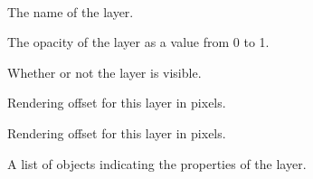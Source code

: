 \documentclass[letterpaper,10pt,english]{sphinxmanual}
\begin{document}
\begin{fulllineitems}
\label{index:tmx.Layer}~

\begin{fulllineitems}
\label{index:tmx.Layer.name}
The name of the layer.

\end{fulllineitems}


\begin{fulllineitems}
\label{index:tmx.Layer.opacity}
The opacity of the layer as a value from 0 to 1.

\end{fulllineitems}


\begin{fulllineitems}
\label{index:tmx.Layer.visible}
Whether or not the layer is visible.

\end{fulllineitems}


\begin{fulllineitems}
\label{index:tmx.Layer.offsetx}
Rendering offset for this layer in pixels.

\end{fulllineitems}


\begin{fulllineitems}
\label{index:tmx.Layer.offsety}
Rendering offset for this layer in pixels.

\end{fulllineitems}


\begin{fulllineitems}
\label{index:tmx.Layer.properties}
A list of {\hyperref[index:tmx.Property]{\emph{}}} objects indicating the properties of
the layer.


\end{fulllineitems}
\end{fulllineitems}
\end{document}
